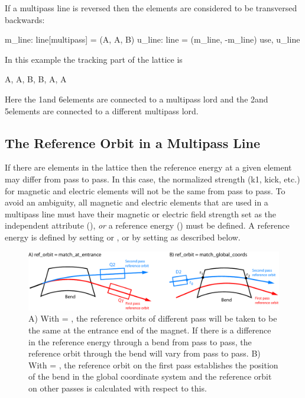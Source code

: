 If a multipass line is reversed then the elements are considered to be
transversed backwards:
\begin{example}
  m_line: line[multipass] = (A, A, B)
  u_line: line = (m_line, -m_line)
  use, u_line
\end{example}
In this example the tracking part of the lattice is
\begin{example}
  A, A, B, B, A, A
\end{example}
Here the 1\St and 6\Th elements are connected to a multipass lord and the
2\Nd and 5\Th elements are connected to a different multipass lord.

\subsection{The Reference Orbit in a Multipass Line}

If there are  elements in the lattice then the reference
energy at a given element may differ from pass to pass. In this case,
the normalized strength (k1, kick, etc.) for magnetic and electric
elements will not be the same from pass to pass. To avoid an
ambiguity, all magnetic and electric elements that are used in a
multipass line must have their magnetic or electric field strength set
as the independent attribute (), {\em or} a reference
energy () must be defined. A reference energy is
defined by setting  or , or by setting
 as described below. 

\begin{figure}[tb]
\centering 
\includegraphics[width=6.2in]{multipass_bend.pdf} 
\caption[The reference orbit with a multipass bend.]  
{A) With  = , the reference orbits
of different pass will be taken to be the same at the entrance end of
the magnet. If there is a difference in the reference energy through a
bend from pass to pass, the reference orbit through the bend will vary
from pass to pass. B) With  = ,
the reference orbit on the first pass establishes the position of the
bend in the global coordinate system and the reference orbit on other
passes is calculated with respect to this.}
\label{f:multipass.bend}
\end{figure}


